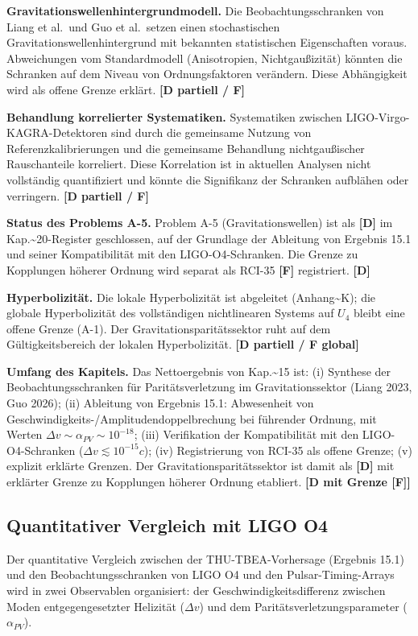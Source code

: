 ﻿\documentclass[11pt,letterpaper]{article}
\begin{document}
\textbf{Gravitationswellenhintergrundmodell.} Die Beobachtungsschranken von Liang et al.\ und Guo et al.\ setzen einen stochastischen Gravitationswellenhintergrund mit bekannten statistischen Eigenschaften voraus. Abweichungen vom Standardmodell (Anisotropien, Nichtgaußizität) könnten die Schranken auf dem Niveau von Ordnungsfaktoren verändern. Diese Abhängigkeit wird als offene Grenze erklärt. \textbf{[D partiell / F]}

\textbf{Behandlung korrelierter Systematiken.} Systematiken zwischen LIGO-Virgo-KAGRA-Detektoren sind durch die gemeinsame Nutzung von Referenzkalibrierungen und die gemeinsame Behandlung nichtgaußischer Rauschanteile korreliert. Diese Korrelation ist in aktuellen Analysen nicht vollständig quantifiziert und könnte die Signifikanz der Schranken aufblähen oder verringern. \textbf{[D partiell / F]}

\textbf{Status des Problems A-5.} Problem A-5 (Gravitationswellen) ist als \textbf{[D]} im Kap.\textasciitilde{}20-Register geschlossen, auf der Grundlage der Ableitung von Ergebnis 15.1 und seiner Kompatibilität mit den LIGO-O4-Schranken. Die Grenze zu Kopplungen höherer Ordnung wird separat als RCI-35 \textbf{[F]} registriert. \textbf{[D]}

\textbf{Hyperbolizität.} Die lokale Hyperbolizität ist abgeleitet (Anhang\textasciitilde{}K); die globale Hyperbolizität des vollständigen nichtlinearen Systems auf $U_4$ bleibt eine offene Grenze (A-1). Der Gravitationsparitätssektor ruht auf dem Gültigkeitsbereich der lokalen Hyperbolizität. \textbf{[D partiell / F global]}

\textbf{Umfang des Kapitels.} Das Nettoergebnis von Kap.\textasciitilde{}15 ist: (i) Synthese der Beobachtungsschranken für Paritätsverletzung im Gravitationssektor (Liang 2023, Guo 2026); (ii) Ableitung von Ergebnis 15.1: Abwesenheit von Geschwindigkeits-/Amplitudendoppelbrechung bei führender Ordnung, mit Werten $\Delta v \sim \alpha_{PV} \sim 10^{-18}$; (iii) Verifikation der Kompatibilität mit den LIGO-O4-Schranken ($\Delta v \lesssim 10^{-15}c$); (iv) Registrierung von RCI-35 als offene Grenze; (v) explizit erklärte Grenzen. Der Gravitationsparitätssektor ist damit als \textbf{[D]} mit erklärter Grenze zu Kopplungen höherer Ordnung etabliert. \textbf{[D mit Grenze [F]]}
\subsection{Quantitativer Vergleich mit LIGO O4}
Der quantitative Vergleich zwischen der THU-TBEA-Vorhersage (Ergebnis 15.1) und den Beobachtungsschranken von LIGO O4 und den Pulsar-Timing-Arrays wird in zwei Observablen organisiert: der Geschwindigkeitsdifferenz zwischen Moden entgegengesetzter Helizität ($\Delta v$) und dem Paritätsverletzungsparameter ($\alpha_{PV}$).
\end{document}
